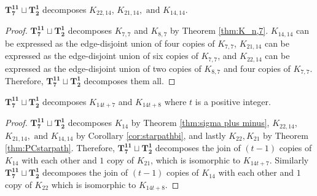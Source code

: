 \documentclass{dmgt}
\newcommand{\ZZ}{\ensuremath{\mathbb{Z}}} %
\begin{document}

    
\newpage
\begin{cor}\label{cor:starpathbi}
    $\mathbf{T_{7}^{11}}\sqcup\mathbf{T_{2}^{1}}$ decomposes $K_{22,14}$, $K_{21,14},\text{ and }K_{14,14}$.
\end{cor}

\begin{proof}
    $\mathbf{T_{7}^{11}}\sqcup\mathbf{T_{2}^{1}}$ decomposes $K_{7,7}$ and $K_{8,7}$ by Theorem \ref{thm:K_n,7}. $K_{14,14}$ can be expressed as the edge-disjoint union of four copies of $K_{7,7}$, $K_{21,14}$ can be expressed as the edge-disjoint union of six copies of $K_{7,7}$, and $K_{22,14}$ can be expressed as the edge-disjoint union of two copies of $K_{8,7}$ and four copies of $K_{7,7}$. Therefore, $\mathbf{T_{7}^{11}}\sqcup\mathbf{T_{2}^{1}}$ decomposes them all.
\end{proof}

\begin{theorem}
$\mathbf{T_{7}^{11}}\sqcup\mathbf{T_{2}^{1}}$ decomposes $K_{14t+7}$ and $K_{14t+8}$ where $t$ is a positive integer. 
\end{theorem}
\begin{proof}
$\mathbf{T_{7}^{11}}\sqcup\mathbf{T_{2}^{1}}$ decomposes $K_{14}$ by Theorem \ref{thm:sigma plus minus}, $K_{22,14}$, $K_{21,14},\text{ and }K_{14,14}$ by Corollary \ref{cor:starpathbi}, and lastly $K_{22},K_{21}$ by Theorem \ref{thm:PCstarpath}.
\newline\newline
Therefore, $\mathbf{T_{7}^{11}}\sqcup\mathbf{T_{2}^{1}}$ decomposes the join of $(t-1)$ copies of $K_{14}$ with each other and $1$ copy of $K_{21}$, which is isomorphic to $K_{14t+7}$. Similarly $\mathbf{T_{7}^{11}}\sqcup\mathbf{T_{2}^{1}}$ decomposes the join of $(t-1)$ copies of $K_{14}$ with each other and $1$ copy of $K_{22}$ which is isomorphic to $K_{14t+8}$.
\end{proof}
\end{document}
